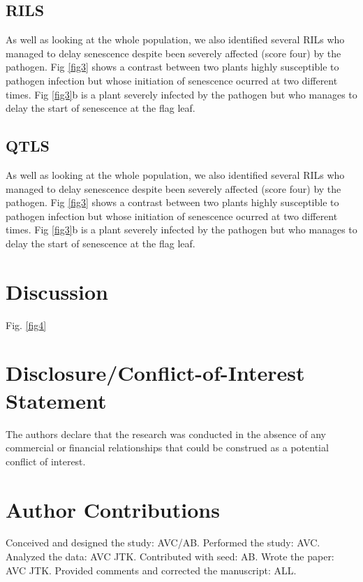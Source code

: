 \documentclass{frontiersSCNS} %
\begin{document}
\subsection{RILS}

As well as looking at the whole population, we also identified several RILs who managed to delay senescence despite been severely affected (score four) by the pathogen. Fig \ref{fig3} shows a contrast between two plants highly susceptible to pathogen infection but whose initiation of senescence ocurred at two different times. Fig \ref{fig3}b is a plant severely infected by the pathogen but who manages to delay the start of senescence at the flag leaf. 


\subsection{QTLS}

As well as looking at the whole population, we also identified several RILs who managed to delay senescence despite been severely affected (score four) by the pathogen. Fig \ref{fig3} shows a contrast between two plants highly susceptible to pathogen infection but whose initiation of senescence ocurred at two different times. Fig \ref{fig3}b is a plant severely infected by the pathogen but who manages to delay the start of senescence at the flag leaf. 

\section{Discussion}

Fig. \ref{fig4}

\section*{Disclosure/Conflict-of-Interest Statement}


The authors declare that the research was conducted in the absence of any commercial or financial relationships that could be construed as a potential conflict of interest.

\section*{Author Contributions}

Conceived and designed the study: AVC/AB. Performed the study: AVC. Analyzed the data: AVC JTK. Contributed with seed: AB. Wrote the paper: AVC JTK. Provided comments and corrected the manuscript: ALL.
\end{document}
